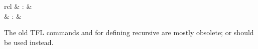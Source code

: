 \begin{isabellebody}
\begin{isamarkuptext}
\begin{description}
  \end{description}%
\end{isamarkuptext}%
\isamarkuptrue%
%
\isamarkuptrue%
%
\begin{isamarkuptext}%
\begin{matharray}{rcl}
    \hypertarget{command.HOL.recdef}{\hyperlink{command.HOL.recdef}{\mbox{}}} & : &  \\
    \hypertarget{command.HOL.recdef-tc}{\hyperlink{command.HOL.recdef-tc}{\mbox{}}} & : &  \\
  \end{matharray}

  The old TFL commands \hyperlink{command.HOL.recdef}{\mbox{}} and \hyperlink{command.HOL.recdef-tc}{\mbox{}} for defining recursive are mostly obsolete; \hyperlink{command.HOL.function}{\mbox{}} or \hyperlink{command.HOL.fun}{\mbox{}} should be used instead.


\end{isamarkuptext}
\end{isabellebody}
